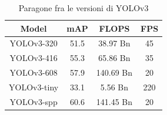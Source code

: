 \documentclass[a4paper]{article}
\begin{document}
	\begin{table}[htpb]
		\centering
		\begin{tabular}{ |c|c|c|c| } 
			\hline
			Model & mAP & FLOPS & FPS \\
			\hline	
			 YOLOv3-320    & 51.5  &  38.97  Bn  &  45  \\ 
			 YOLOv3-416    & 55.3  &  65.86  Bn  &  35  \\ 
			 YOLOv3-608    & 57.9  &  140.69 Bn  &  20  \\ 
			 YOLOv3-tiny   & 33.1  &  5.56   Bn  &  220 \\
			 YOLOv3-spp    & 60.6  &  141.45 Bn  &  20  \\
			\hline
		\end{tabular}
	    \caption{Paragone fra le versioni di YOLOv3}
		\label{tab:comparison}
	\end{table}
\end{document}
